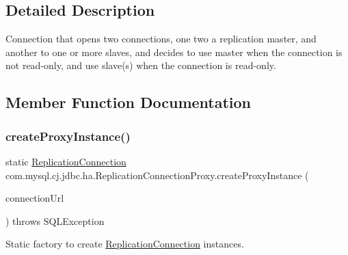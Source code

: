 \subsection{Detailed Description}
Connection that opens two connections, one two a replication master, and another to one or more slaves, and decides to use master when the connection is not read-\/only, and use slave(s) when the connection is read-\/only. 

\subsection{Member Function Documentation}
\mbox{\label{classcom_1_1mysql_1_1cj_1_1jdbc_1_1ha_1_1_replication_connection_proxy_ae2b51d44466e63adbc4f963f0d4739d7}} 
\subsubsection{\texorpdfstring{create\+Proxy\+Instance()}{createProxyInstance()}}
{\footnotesize\ttfamily static \mbox{\hyperlink{interfacecom_1_1mysql_1_1cj_1_1jdbc_1_1ha_1_1_replication_connection}{Replication\+Connection}} com.\+mysql.\+cj.\+jdbc.\+ha.\+Replication\+Connection\+Proxy.\+create\+Proxy\+Instance (\begin{DoxyParamCaption}\item[{\mbox{\hyperlink{classcom_1_1mysql_1_1cj_1_1conf_1_1url_1_1_replication_connection_url}{Replication\+Connection\+Url}}}]{connection\+Url }\end{DoxyParamCaption}) throws S\+Q\+L\+Exception\hspace{0.3cm}{\ttfamily [static]}}

Static factory to create \mbox{\hyperlink{interfacecom_1_1mysql_1_1cj_1_1jdbc_1_1ha_1_1_replication_connection}{Replication\+Connection}} instances.


